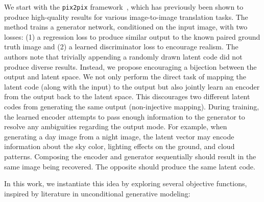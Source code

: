 We start with the \texttt{pix2pix} framework~\citep{isola2016image}, which has previously been shown to produce high-quality results for various image-to-image translation tasks. The method trains a generator network, conditioned on the input image, with two losses: (1) a regression loss to produce similar output to the known paired ground truth image and (2) a learned discriminator loss to encourage realism. The authors note that trivially appending a randomly drawn latent code did not produce diverse results. Instead, we propose encouraging a bijection between the output and latent space. We not only perform the direct task of mapping the latent code (along with the input) to the output but also jointly learn an encoder from the output back to the latent space. This discourages two different latent codes from generating the same output (non-injective mapping). During training, the learned encoder attempts to pass enough information to the generator to resolve any ambiguities regarding the output mode. For example, when generating a day image from a night image, the latent vector may encode information about the sky color, lighting effects on the ground, and cloud patterns.  Composing the encoder and generator sequentially should result in the same image being recovered. The opposite should produce the same latent code.

In this work, we instantiate this idea by exploring several objective functions, inspired by literature in unconditional generative modeling:

